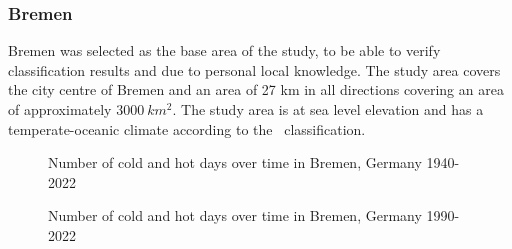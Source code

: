 \documentclass[12pt,a4paper, english,twoside]{scrartcl}
\begin{document}
    \subsubsection{Bremen}
      Bremen was selected as the base area of the study, to be able to verify classification results and due to personal local knowledge. 
      The study area covers the city centre of Bremen and an area of 27 km in all directions covering an area of approximately $3000\ km^2$. 
      The study area is at sea level elevation and has a temperate-oceanic climate according to the~\autocite{koppen1930handbuch} classification.%
\newpage
\begin{landscape}
      \begin{figure}[!p]
          
        \caption{Number of cold and hot days over time in Bremen, Germany 1940-2022\label{fig:breTempExtr}}
      \end{figure}
\end{landscape}
\begin{landscape}
      \begin{figure}[!p]
           
           \caption{Number of cold and hot days over time in Bremen, Germany 1990-2022\label{fig:breTempExtr2}}
      \end{figure}
\end{landscape}
\end{document}
